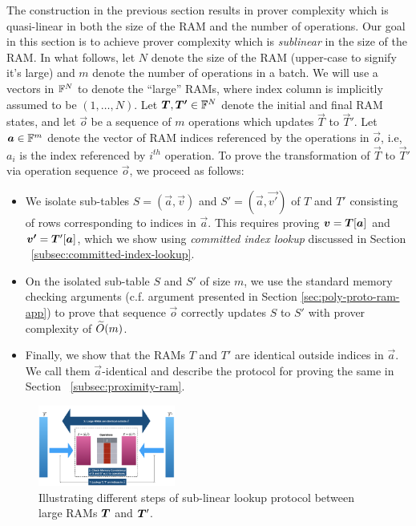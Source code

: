 
The construction in the previous section results in prover complexity which is quasi-linear in both the
size of the RAM and the number of operations.
Our goal in this section is to achieve prover complexity which is {\em sublinear} in the size of the RAM.
In what follows, let $N$ denote the size of the RAM (upper-case to signify it's large) and $m$ denote the number
of operations in a batch. We will use a vectors in $\mathbb{F}^N$ to denote the ``large'' RAMs, where index column is implicitly
assumed to be $(1,\ldots,N)$.
Let $\vec{T},\vec{T'}\in \F^N$ denote the initial and final RAM states, and let $\vec{o}$ be
a sequence of $m$ operations which updates $\vec{T}$ to $\vec{T}'$. Let $\vec{a}\in \F^m$ denote the vector
of RAM indices referenced by the operations in $\vec{o}$, i.e, $a_i$ is the index referenced by $i^{th}$ operation.
To prove the transformation of $\vec{T}$ to $\vec{T}'$ via operation sequence $\vec{o}$, we proceed as follows:
\begin{itemize}[leftmargin=2em, label=-]
    \item We isolate sub-tables $S=(\vec{a},\vec{v})$ and $S'=(\vec{a},\vec{v'})$ of $T$ and $T'$ consisting of
    rows corresponding to indices in $\vec{a}$. This requires proving $\vec{v}=\vecT[\vec{a}]$ and $\vec{v'}=
    \vecT'[\vec{a}]$, which we show using {\em committed index lookup} discussed in Section ~\ref{subsec:committed-index-lookup}.

    \item On the isolated sub-table $S$ and $S'$ of size $m$, we use the standard memory checking arguments (c.f. argument
    presented in Section \ref{sec:poly-proto-ram-app}) to prove that sequence $\vec{o}$ correctly updates $S$ to $S'$ with
    prover complexity of $\widetilde{O}(m)$.

    \item Finally, we show that the RAMs $T$ and $T'$ are identical outside indices in $\vec{a}$. We call them $\vec{a}$-identical
    and describe the protocol for proving the same in Section ~\ref{subsec:proximity-ram}.
\end{itemize}

\begin{figure}[htbp]
    \centering
    \includegraphics[width=0.4\textwidth]{RAM-Lookup}
    \caption{Illustrating different steps of sub-linear lookup protocol between large RAMs $\vecT$ and $\vecT'$.}
    \label{fig:blueprint}
\end{figure}


